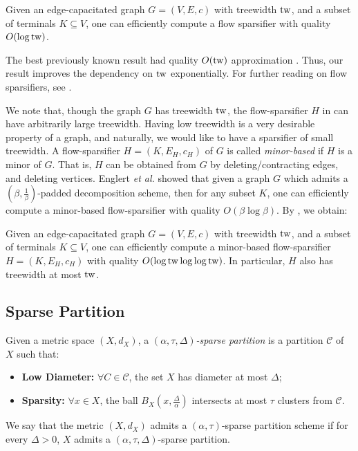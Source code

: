 \documentclass{article}
\newcommand{\tw}{{\rm tw}}
\newcommand{\etal}{{\em et al. \xspace}}
\def\cC{\ensuremath{\mathcal{C}}}
\begin{document}
\begin{corollary}\label{cor:flowSpar}
	Given an edge-capacitated graph $G = (V,E,c)$ with treewidth $\tw$, and a subset of terminals $K\subseteq V$, one can efficiently compute a flow sparsifier with quality $O(\log\tw)$. 
\end{corollary}

The best previously known result had quality $O(\tw)$ approximation \cite{EGKRTT14,AGGNT19}. Thus, our result improves the dependency on $\tw$ exponentially.  For further reading on flow sparsifiers, see \cite{Moitra09,MT10,MM10,CLLM10,Chuzhoy12,AGK14}.

We note that, though the graph $G$ has treewidth $\tw$, the flow-sparsifier $H$ in  can have arbitrarily large treewidth. Having low treewidth is a very desirable property of a graph, and naturally, we would like to have a sparsifier of small treewidth. A flow-sparsifier  $H = (K,E_H,  c_H)$ of $G$ is called \emph{minor-based} if $H$ is a minor of $G$. That is, $H$ can be obtained from $G$ by deleting/contracting edges, and deleting vertices. Englert \etal \cite{EGKRTT14} showed that given a graph $G$ which admits a $(\beta,\frac1\beta)$-padded decomposition scheme, then for any subset $K$, one can efficiently compute a minor-based flow-sparsifier with
quality $O(\beta\log\beta)$. By , we obtain:

\begin{corollary}\label{cor:flowSparMinorBased}
	Given an edge-capacitated graph $G = (V,E,c)$ with treewidth $\tw$, and a subset of terminals $K\subseteq V$, one can efficiently compute a minor-based flow-sparsifier  $H = (K,E_H, c_H)$ with quality $O(\log\tw\log\log\tw)$. In particular, $H$ also has treewidth at most $\tw$.
\end{corollary}

\subsection{Sparse Partition}

Given a metric space $(X,d_X)$,
a \emph{$(\alpha, \tau,\Delta)$-sparse partition} is a partition $\cC$ of $X$ such that:
\begin{itemize}
	\item \textbf{Low Diameter:} $\forall C\in\cC$, the set $X$ has diameter at most $\Delta$;
	\item \textbf{Sparsity:} $\forall x \in X$, the ball $B_X(x, \frac{\Delta}{\alpha})$ intersects at most $\tau$ clusters from $\cC$.
\end{itemize}
We say that the metric $(X,d_X)$ admits a $(\alpha, \tau)$-sparse partition scheme if for every $\Delta>0$, $X$ admits a $(\alpha, \tau,\Delta)$-sparse partition.
\end{document}

